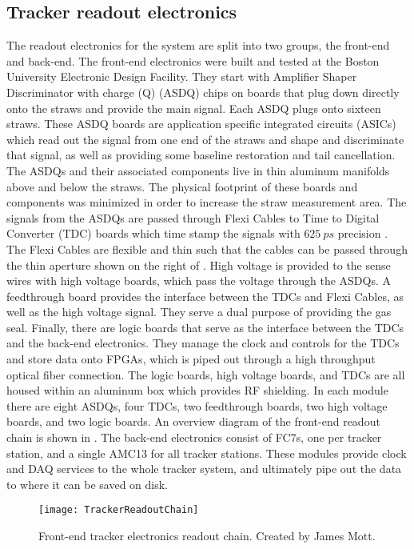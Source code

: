 \subsection{Tracker readout electronics}


The readout electronics for the system are split into two groups, the front-end and back-end. The front-end electronics were built and tested at the Boston University Electronic Design Facility. They start with Amplifier Shaper Discriminator with charge (Q) (ASDQ) chips on boards that plug down directly onto the straws and provide the main signal. Each ASDQ plugs onto sixteen straws. These ASDQ boards are application specific integrated circuits (ASICs) which read out the signal from one end of the straws and shape and discriminate that signal, as well as providing some baseline restoration and tail cancellation. The ASDQs and their associated components live in thin aluminum manifolds above and below the straws. The physical footprint of these boards and components was minimized in order to increase the straw measurement area. The signals from the ASDQs are passed through Flexi Cables to Time to Digital Converter (TDC) boards which time stamp the signals with $\SI{625}{ps}$ precision \cite{WTThesis}. The Flexi Cables are flexible and thin such that the cables can be passed through the thin aperture shown on the right of . High voltage is provided to the sense wires with high voltage boards, which pass the voltage through the ASDQs. A feedthrough board provides the interface between the TDCs and Flexi Cables, as well as the high voltage signal. They serve a dual purpose of providing the gas seal. Finally, there are logic boards that serve as the interface between the TDCs and the back-end electronics. They manage the clock and controls for the TDCs and store data onto FPGAs, which is piped out through a high throughput optical fiber connection. The logic boards, high voltage boards, and TDCs are all housed within an aluminum box which provides RF shielding. In each module there are eight ASDQs, four TDCs, two feedthrough boards, two high voltage boards, and two logic boards. An overview diagram of the front-end readout chain is shown in . The back-end electronics consist of FC7s, one per tracker station, and a single AMC13 for all tracker stations. These modules provide clock and DAQ services to the whole tracker system, and ultimately pipe out the data to where it can be saved on disk.


\begin{figure}[]
    \centering
    \texttt{[image: TrackerReadoutChain]}
    \caption[Tracker electronics readout chain]{Front-end tracker electronics readout chain. Created by James Mott.}   
    \label{fig:TrackerReadoutChain}
\end{figure}



